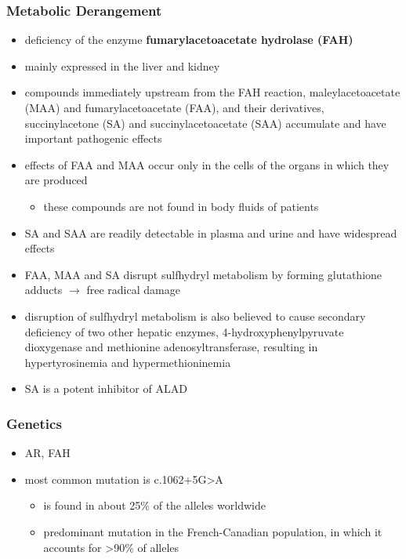 \documentclass{scrartcl}
\begin{document}
\subsubsection{Metabolic Derangement}
\label{sec:org9c16e68}
\begin{itemize}
\item deficiency of the enzyme \textbf{fumarylacetoacetate hydrolase (FAH)}
\item mainly expressed in the liver and kidney
\item compounds immediately upstream from the FAH reaction,
maleylacetoacetate (MAA) and fumarylacetoacetate (FAA), and their
derivatives, succinylacetone (SA) and succinylacetoacetate (SAA)
accumulate and have important pathogenic effects
\item effects of FAA and MAA occur only in the cells of the organs in which they are produced
\begin{itemize}
\item these compounds are not found in body fluids of patients
\end{itemize}
\item SA and SAA are readily detectable in plasma and urine and have
widespread effects
\item FAA, MAA and SA disrupt sulfhydryl metabolism by forming glutathione
adducts \(\to\) free radical damage
\item disruption of sulfhydryl metabolism is also believed to cause
secondary deficiency of two other hepatic enzymes,
4-hydroxyphenylpyruvate dioxygenase and methionine
adenosyltransferase, resulting in hypertyrosinemia and
hypermethioninemia
\item SA is a potent inhibitor of ALAD
\end{itemize}

\subsubsection{Genetics}
\label{sec:orgc75fbb1}
\begin{itemize}
\item AR, FAH
\item most common mutation is c.1062+5G>A
\begin{itemize}
\item is found in about 25\% of the alleles worldwide
\item predominant mutation in the French-Canadian population, in which
it accounts for >90\% of alleles
\end{itemize}
\end{itemize}
\end{document}
